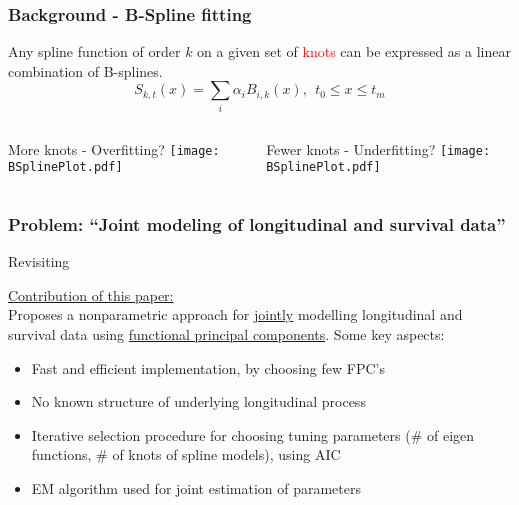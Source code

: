 \documentclass[10pt,dvipsnames,table, handout]{beamer} %
\begin{document}
\begin{frame}
\frametitle{Background - B-Spline fitting}
Any spline function of order $k$ on a given set of {\textcolor{red}{knots}} can be expressed as a linear combination of B-splines. 
\[ S_{k,t}(x) =\sum_i \alpha_i B_{i,k}(x),\ \ t_0 \leq x \leq t_m \]
\pause
\begin{columns}
\begin{center}
More knots - Overfitting?
\texttt{[image: BSplinePlot.pdf]}
\end{center}

\begin{center}
Fewer knots - Underfitting?
\texttt{[image: BSplinePlot.pdf]}
\end{center}
\end{columns}
\end{frame}


\begin{frame}
\frametitle{Problem: ``Joint modeling of longitudinal and survival data''}
Revisiting\\
\vspace{1cm}

{\underline{Contribution of this paper:}} \\
Proposes a nonparametric approach for {\underline{jointly}} modelling longitudinal and survival data using {\underline{functional principal components}}. Some key aspects:\\
\begin{itemize}
\item Fast and efficient implementation, by choosing few FPC's
\item No known structure of underlying longitudinal process
\item Iterative selection procedure for choosing tuning parameters (\# of eigen functions, \# of knots of spline models), using AIC 
\item EM algorithm used for joint estimation of parameters
\end{itemize}
\end{frame}
\end{document}
